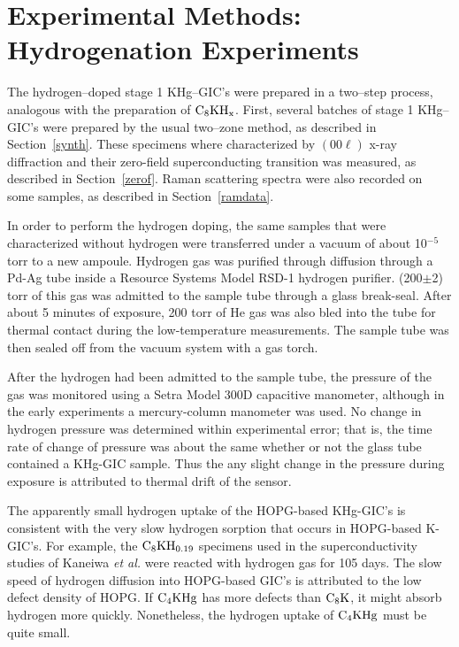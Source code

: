 \section{Experimental Meth\-ods: Hy\-dro\-gen\-ation Ex\-per\-i\-ments}
\label{khghyd:exp}

	The hydrogen--doped stage 1 KHg--GIC's were prepared in a two--step
process,     analogous     with      the     preparation     of    $    \rm
C_{8}KH_{x}$.\cite{lagrange78} First, several batches of stage 1 KHg--GIC's
were  prepared    by    the usual two--zone       method,  as described  in
Section~\ref{synth}.   These   specimens  where characterized by $(00\ell)$
x-ray  diffraction  and their  zero-field superconducting   transition  was
measured,  as described  in Section~\ref{zerof}.  Raman scattering  spectra
were also recorded on some samples, as described in Section~\ref{ramdata}.

	In order to perform the hydrogen doping, the same samples that were
characterized  without  hydrogen were transferred under a  vacuum  of about
10$^{-5}$  torr  to  a  new  ampoule.   Hydrogen  gas was  purified through
diffusion  through a Pd-Ag tube   inside a  Resource Systems   Model  RSD-1
hydrogen purifier.  (200$\pm$2) torr of this gas was admitted to the sample
tube through  a glass break-seal.  After  about 5  minutes of exposure, 200
torr of He gas was also bled  into the  tube for thermal contact during the
low-temperature measurements.  The sample tube was then sealed off from the
vacuum system with a gas torch.

        After  the   hydrogen had  been admitted to   the sample tube,  the
pressure of  the gas   was monitored  using a  Setra Model  300D capacitive
manometer, although in the early experiments a mercury-column manometer was
used.  No  change in hydrogen pressure  was determined within  experimental
error;  that is, the  time  rate of change of   pressure was about the same
whether or  not the glass tube contained  a KHg-GIC sample.  Thus the   any slight
change in the  pressure  during exposure is attributed to  thermal drift of
the sensor.

        The apparently small hydrogen uptake of the HOPG-based KHg-GIC's is
consistent  with the very slow  hydrogen sorption that occurs in HOPG-based
K-GIC's.\cite{guerard83} For example, the $\rm C_8KH_{0.19}$ specimens used
in  the  superconductivity studies of  Kaneiwa {\em  et al.\/} were reacted
with hydrogen gas for 105 days.\cite{kaneiwa82} The slow  speed of hydrogen
diffusion into HOPG-based GIC's is attributed to the low defect  density of
HOPG.  If  $\rm C_4KHg$ has  more defects than $\rm  C_8K$, it might absorb
hydrogen  more quickly.  Nonetheless, the hydrogen  uptake  of $\rm C_4KHg$
must be quite small.

